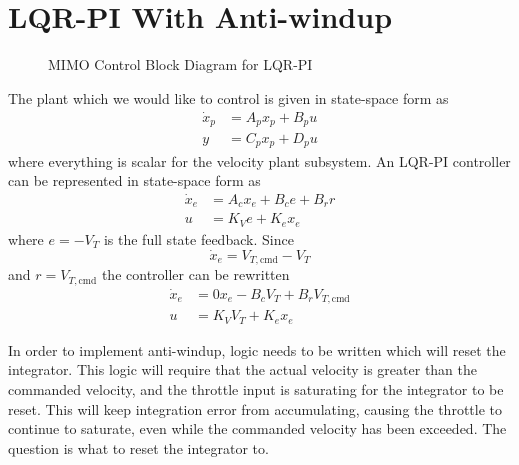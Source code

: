 \section{LQR-PI With Anti-windup}

\begin{figure}[H]
  \begin{center}
    \caption{MIMO Control Block Diagram for LQR-PI}
  \end{center}
\end{figure}

The plant which we would like to control is given in state-space form as
\begin{align*}
  \dot{x}_{p}&=A_{p}x_{p}+B_{p}u \\
  y&=C_{p}x_{p}+D_{p}u
\end{align*}
where everything is scalar for the velocity plant subsystem.
An LQR-PI controller can be represented in state-space form as
\begin{align*}
  \dot{x}_{e}&=A_{c}x_{e}+B_{c}e+B_{r}r \\
  u&=K_{V}e+K_{e}x_{e}
\end{align*}
where $e=-V_{T}$ is the full state feedback.
Since
\begin{equation*}
  \dot{x}_{e}=V_{T,\text{cmd}}-V_{T}
\end{equation*}
and $r=V_{T,\text{cmd}}$ the controller can be rewritten
\begin{align*}
  \dot{x}_{e}&=0x_{e}-B_{c}V_{T}+B_{r}V_{T,\text{cmd}} \\
  u&=K_{V}V_{T}+K_{e}x_{e}
\end{align*}

In order to implement anti-windup, logic needs to be written which will reset the integrator.
This logic will require that the actual velocity is greater than the commanded velocity, and the throttle input is saturating for the integrator to be reset.
This will keep integration error from accumulating, causing the throttle to continue to saturate, even while the commanded velocity has been exceeded.
The question is what to reset the integrator to.

